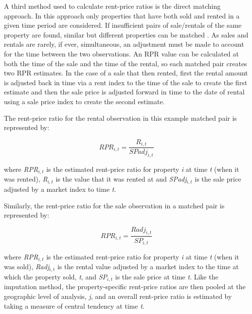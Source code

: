 \documentclass{article}\usepackage[]{graphicx}\usepackage[]{color}
\begin{document}
A third method used to calculate rent-price ratios is the direct matching approach.  In this approach only properties that have both sold and rented in a given time period are considered. If insufficient pairs of sale/rentals of the same property are found, similar but different properties can be matched \citep*{smith2006bubble}.  As sales and rentals are rarely, if ever, simultaneous, an adjustment must be made to account for the time between the two observations. An RPR value can be calculated at both the time of the sale and the time of the rental, so each matched pair creates two RPR estimates. In the case of a sale that then rented, first the rental amount is adjusted back in time via a rent index to the time of the sale to create the first estimate and then the sale price is adjusted forward in time to the date of rental using a sale price index to create the second estimate. 

The rent-price ratio for the rental observation in this example matched pair is represented by:

\begin{equation}
RPR_{i,t} = \frac{R_{i,t}
  }{
  SPadj_{i,t}
  }
\end{equation}

where \textit{RPR$_{i,t}$} is the estimated rent-price ratio for property \textit{i} at time \textit{t} (when it was rented), \textit{R$_{i,t}$} is the value that it was rented at and \textit{SPadj$_{i,t}$} is the sale price adjusted by a market index to time \textit{t}.\par

Similarly, the rent-price ratio for the sale observation in a matched pair is represented by:

\begin{equation}
RPR_{i,t} = \frac{Radj_{i,t}
  }{
  SP_{i,t}
  }
\end{equation}

where \textit{RPR$_{i,t}$} is the estimated rent-price ratio for property \textit{i} at time \textit{t} (when it was sold), \textit{Radj$_{i,t}$} is the rental value adjusted by a market index to the time at which the property sold, \textit{t}, and \textit{SP$_{i,t}$} is the sale price at time \textit{t}. Like the imputation method, the property-specific rent-price ratios are then pooled at the geographic level of analysis, \textit{j}, and an overall rent-price ratio is estimated by taking a measure of central tendency at time \textit{t}.\par
\end{document}

